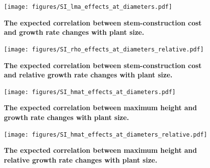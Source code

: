 \documentclass[12pt, a4paper]{article}
\begin{document}
\begin{figure}[htbp]
\centering
\texttt{[image: figures/SI\_lma\_effects\_at\_diameters.pdf]}
\caption{\textbf{The expected correlation between stem-construction cost
and growth rate changes with plant size.} \label{f-rho_growth_size}}
\end{figure}

\begin{figure}[htbp]
\centering
\texttt{[image: figures/SI\_rho\_effects\_at\_diameters\_relative.pdf]}
\caption{\textbf{The expected correlation between stem-construction cost
and relative growth rate changes with plant size.}
\label{f-rho_growth_size_relative}}
\end{figure}

\begin{figure}[htbp]
\centering
\texttt{[image: figures/SI\_hmat\_effects\_at\_diameters.pdf]}
\caption{\textbf{The expected correlation between maximum height and
growth rate changes with plant size.} \label{f-rho_growth_size}}
\end{figure}

\begin{figure}[htbp]
\centering
\texttt{[image: figures/SI\_hmat\_effects\_at\_diameters\_relative.pdf]}
\caption{\textbf{The expected correlation between maximum height and
relative growth rate changes with plant size.}
\label{f-hmat_growth_size_relative}}
\end{figure}

\newpage


\end{document}
